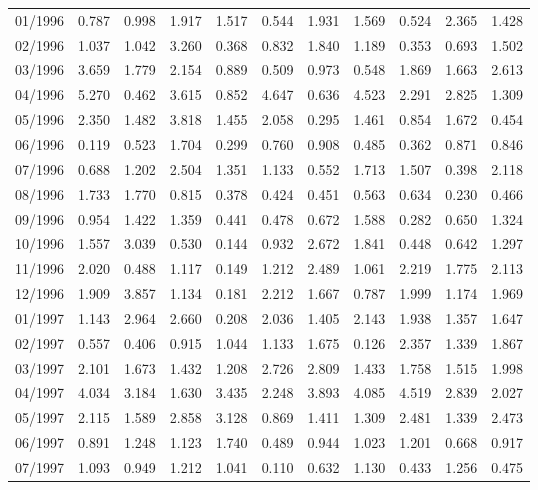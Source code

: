 \begin{tabular}{lrrrrrrrrrr}
01/1996 &  0.787 &  0.998 &  1.917 &  1.517 &  0.544 &  1.931 &  1.569 &  0.524 &  2.365 &  1.428 \\
02/1996 &  1.037 &  1.042 &  3.260 &  0.368 &  0.832 &  1.840 &  1.189 &  0.353 &  0.693 &  1.502 \\
03/1996 &  3.659 &  1.779 &  2.154 &  0.889 &  0.509 &  0.973 &  0.548 &  1.869 &  1.663 &  2.613 \\
04/1996 &  5.270 &  0.462 &  3.615 &  0.852 &  4.647 &  0.636 &  4.523 &  2.291 &  2.825 &  1.309 \\
05/1996 &  2.350 &  1.482 &  3.818 &  1.455 &  2.058 &  0.295 &  1.461 &  0.854 &  1.672 &  0.454 \\
06/1996 &  0.119 &  0.523 &  1.704 &  0.299 &  0.760 &  0.908 &  0.485 &  0.362 &  0.871 &  0.846 \\
07/1996 &  0.688 &  1.202 &  2.504 &  1.351 &  1.133 &  0.552 &  1.713 &  1.507 &  0.398 &  2.118 \\
08/1996 &  1.733 &  1.770 &  0.815 &  0.378 &  0.424 &  0.451 &  0.563 &  0.634 &  0.230 &  0.466 \\
09/1996 &  0.954 &  1.422 &  1.359 &  0.441 &  0.478 &  0.672 &  1.588 &  0.282 &  0.650 &  1.324 \\
10/1996 &  1.557 &  3.039 &  0.530 &  0.144 &  0.932 &  2.672 &  1.841 &  0.448 &  0.642 &  1.297 \\
11/1996 &  2.020 &  0.488 &  1.117 &  0.149 &  1.212 &  2.489 &  1.061 &  2.219 &  1.775 &  2.113 \\
12/1996 &  1.909 &  3.857 &  1.134 &  0.181 &  2.212 &  1.667 &  0.787 &  1.999 &  1.174 &  1.969 \\
01/1997 &  1.143 &  2.964 &  2.660 &  0.208 &  2.036 &  1.405 &  2.143 &  1.938 &  1.357 &  1.647 \\
02/1997 &  0.557 &  0.406 &  0.915 &  1.044 &  1.133 &  1.675 &  0.126 &  2.357 &  1.339 &  1.867 \\
03/1997 &  2.101 &  1.673 &  1.432 &  1.208 &  2.726 &  2.809 &  1.433 &  1.758 &  1.515 &  1.998 \\
04/1997 &  4.034 &  3.184 &  1.630 &  3.435 &  2.248 &  3.893 &  4.085 &  4.519 &  2.839 &  2.027 \\
05/1997 &  2.115 &  1.589 &  2.858 &  3.128 &  0.869 &  1.411 &  1.309 &  2.481 &  1.339 &  2.473 \\
06/1997 &  0.891 &  1.248 &  1.123 &  1.740 &  0.489 &  0.944 &  1.023 &  1.201 &  0.668 &  0.917 \\
07/1997 &  1.093 &  0.949 &  1.212 &  1.041 &  0.110 &  0.632 &  1.130 &  0.433 &  1.256 &  0.475 \\

\end{tabular}
